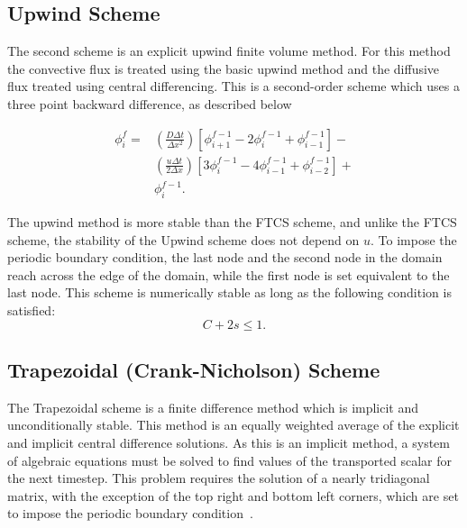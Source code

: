 \documentclass[twocolumn,10pt]{asme2ej}
\begin{document}
\subsection{Upwind Scheme}
The second scheme is an explicit upwind finite volume method. For this method the convective flux is treated using the basic upwind method and the diffusive flux treated using central differencing. This is a second-order scheme which uses a three point backward difference, as described below

\begin{equation}
\label{upwind_eqn}
\begin{split}
\phi_i ^f = & \left( \frac{D \Delta t}{\Delta x^2} \right) \left[ \phi_{i+1} ^{f-1} - 2 \phi_{i} ^{f-1} + \phi_{i-1} ^{f-1} \right] - \\
            & \left( \frac{u \Delta t}{2 \Delta x} \right) \left[ 3 \phi_{i} ^{f-1} - 4 \phi_{i-1} ^{f-1} + \phi_{i-2} ^{f-1} \right] + \\
            & \phi_i ^{f-1}.
\end{split}
\end{equation}

\noindent The upwind method is more stable than the FTCS scheme, and unlike the FTCS scheme, the stability of the Upwind scheme does not depend on $u$. To impose the periodic boundary condition, the last node and the second node in the domain reach across the edge of the domain, while the first node is set equivalent to the last node. This scheme is numerically stable as long as the following condition is satisfied:
\begin{equation}
\label{Upwind_stability}
C + 2s \leq 1.
\end{equation}

\subsection{Trapezoidal (Crank-Nicholson) Scheme}
The Trapezoidal scheme is a finite difference method which is implicit and unconditionally stable. This method is an equally weighted average of the explicit and implicit central difference solutions. As this is an implicit method, a system of algebraic equations must be solved to find values of the transported scalar for the next timestep. This problem requires the solution of a nearly tridiagonal matrix, with the exception of the top right and bottom left corners, which are set to impose the periodic boundary condition~\cite{hogarth1990comparative}.
\end{document}
